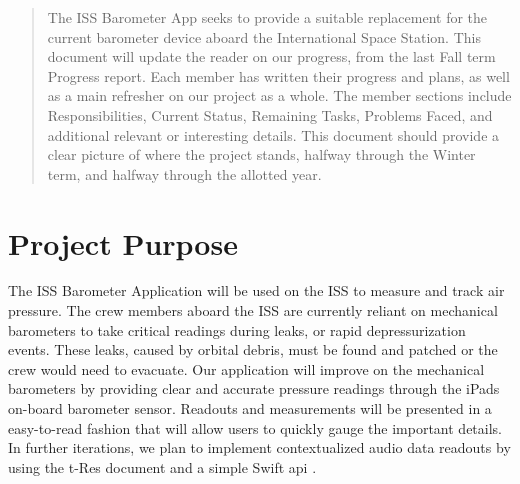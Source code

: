 \documentclass[onecolumn, draftclsnofoot,10pt, compsoc]{IEEEtran}
\def \CapstoneProjectName{ISS Barometer App }
\begin{document}
\begin{titlepage}
\begin{singlespace}
\begin{abstract}
        The \CapstoneProjectName seeks to provide a suitable replacement for the current barometer device aboard the International Space Station.
        This document will update the reader on our progress, from the last Fall term Progress report.
        Each member has written their progress and plans, as well as a main refresher on our project as a whole.
        The member sections include Responsibilities, Current Status, Remaining Tasks, Problems Faced, and additional relevant or interesting details.
        This document should provide a clear picture of where the project stands, halfway through the Winter term, and halfway through the allotted year.
        \end{abstract}
    \end{singlespace}
\end{titlepage}
\newpage
{}
\tableofcontents
\clearpage

\section{Project Purpose}
The ISS Barometer Application will be used on the ISS to measure and track air pressure.
The crew members aboard the ISS are currently reliant on mechanical barometers to take critical readings during leaks, or rapid depressurization events.
These leaks, caused by orbital debris, must be found and patched or the crew would need to evacuate.
Our application will improve on the mechanical barometers by providing clear and accurate pressure readings through the iPads on-board barometer sensor.
Readouts and measurements will be presented in a easy-to-read fashion that will allow users to quickly gauge the important details.
In further iterations, we plan to implement contextualized audio data readouts by using the t-Res document and a simple Swift api \cite{probStat}.
\end{document}
